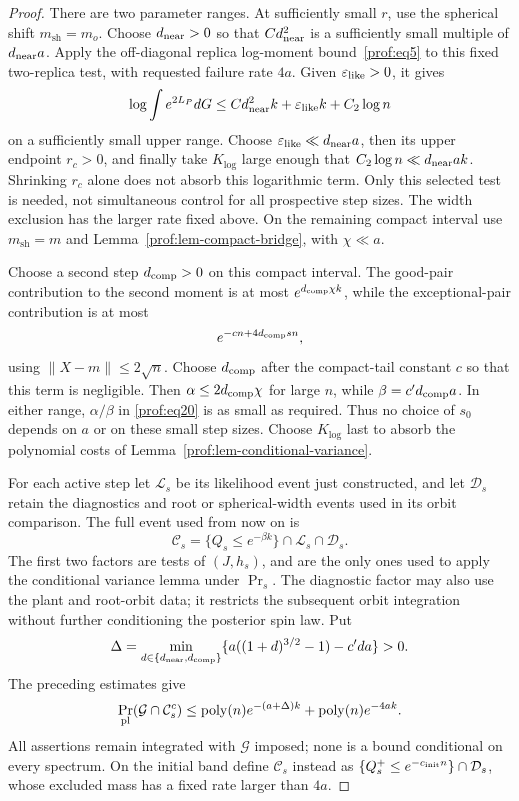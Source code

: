 \begin{proof}
There are two parameter ranges. At sufficiently small \(r\), use the
spherical shift \(m_{\mathrm{sh}}=m_o\). Choose
\(d_{\rm near}>0\) so that \(Cd_{\rm near}^2\) is a
sufficiently small multiple of \(d_{\rm near}a\). Apply the
off-diagonal replica log-moment bound~\eqref{prof:eq5} to this
fixed two-replica test, with requested failure rate \(4a\).
Given \(\varepsilon_{\rm like}>0\), it gives
\[
 \log\int e^{2L_P}dG
 \le Cd_{\rm near}^2k+\varepsilon_{\rm like}k+C_2\log n
\]
on a sufficiently small upper range. Choose
\(\varepsilon_{\rm like}\ll d_{\rm near}a\), then its upper
endpoint \(r_c>0\), and finally take \(K_{\log}\) large enough
that \(C_2\log n\ll d_{\rm near}ak\). Shrinking \(r_c\)
alone does not absorb this logarithmic term.
Only this selected test is needed, not simultaneous control for
all prospective step sizes. The width exclusion has the larger
rate fixed above. On the remaining compact
interval use \(m_{\mathrm{sh}}=m\) and
Lemma~\ref{prof:lem-compact-bridge}, with \(\chi\ll a\).

Choose a second step \(d_{\rm comp}>0\) on this compact interval.
The good-pair contribution to the second moment is at most
\(e^{d_{\rm comp}\chi k}\), while the exceptional-pair
contribution is at most
\[
 e^{-cn+4d_{\rm comp}s n},
\]
using \(\|X-m\|\le2\sqrt n\). Choose \(d_{\rm comp}\) after
the compact-tail constant \(c\) so that this term is negligible.
Then \(\alpha\le 2d_{\rm comp}\chi\) for large \(n\), while
\(\beta=c'd_{\rm comp}a\). In either range,
\(\alpha/\beta\) in \eqref{prof:eq20} is as small as required.
Thus no choice of \(s_0\) depends on \(a\) or on these small step sizes.
Choose \(K_{\log}\) last to absorb the polynomial costs of
Lemma~\ref{prof:lem-conditional-variance}.

For each active step let \(\mathcal L_s\) be its likelihood event
just constructed, and let \(\mathcal D_s\) retain the diagnostics
and root or spherical-width events used in its orbit comparison.
The full event used from now on is
\[
 \mathcal C_s=\{Q_s\le e^{-\beta k}\}
                    \cap\mathcal L_s\cap\mathcal D_s.
\]
The first two factors are tests of \((J,h_s)\), and are the only
ones used to apply the conditional variance lemma under \(\Pr_s\).
The diagnostic factor may also use the plant and root-orbit data;
it restricts the subsequent orbit integration without further
conditioning the posterior spin law. Put
\[
 \Delta=\min_{d\in\{d_{\rm near},d_{\rm comp}\}}
       \{a((1+d)^{3/2}-1)-c'da\}>0.
\]
The preceding estimates give
\[
 \Pr_{\rm pl}(\mathcal G\cap\mathcal C_s^c)
 \le\operatorname{poly}(n)e^{-(a+\Delta)k}
       +\operatorname{poly}(n)e^{-4ak}.
\]
All assertions remain integrated with \(\mathcal G\) imposed;
none is a bound conditional on every spectrum. On the initial band
define \(\mathcal C_s\) instead as
\(\{Q_s^+\le e^{-c_{\rm init}n}\}\cap\mathcal D_s\),
whose excluded mass has a fixed rate larger than \(4a\).


\end{proof}

